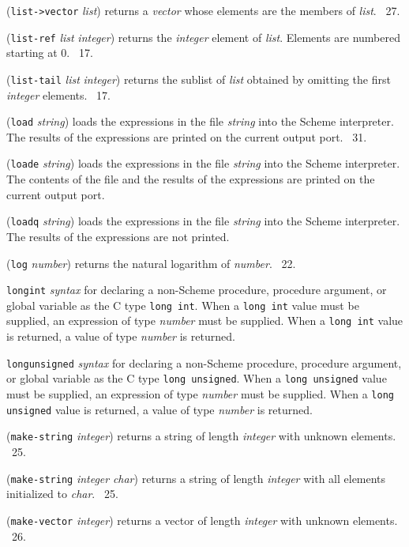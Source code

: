 \documentclass[10pt,twocolumn]{article}
\begin{document}
(\texttt{list->vector} \emph{list}) returns a \emph{vector} whose
elements are the members of \emph{list}.  \RRRRRS~27.

(\texttt{list-ref} \emph{list} \emph{integer}) returns the
\emph{integer} element of \emph{list}.  Elements are numbered starting
at 0.  \RRRRRS~17.

(\texttt{list-tail} \emph{list} \emph{integer}) returns the sublist of
\emph{list} obtained by omitting the first \emph{integer} elements.
\RRRRRS~17.

(\texttt{load} \emph{string}) loads the expressions in the file
\emph{string} into the Scheme interpreter.  The results of the
expressions are printed on the current output port.  \RRRRRS~31.

(\texttt{loade} \emph{string}) loads the expressions in the file
\emph{string} into the Scheme interpreter.  The contents of the file
and the results of the expressions are printed on the current output
port.

(\texttt{loadq} \emph{string}) loads the expressions in the file
\emph{string} into the Scheme interpreter.  The results of the
expressions are not printed.

(\texttt{log} \emph{number}) returns the natural logarithm of
\emph{number}.  \RRRRRS~22.

\texttt{longint} \emph{syntax} for declaring a non-Scheme procedure,
procedure argument, or global variable as the C type \texttt{long
  int}.  When a \texttt{long int} value must be supplied, an
expression of type \emph{number} must be supplied.  When a
\texttt{long int} value is returned, a value of type \emph{number} is
returned.

\texttt{longunsigned} \emph{syntax} for declaring a non-Scheme
procedure, procedure argument, or global variable as the C type
\texttt{long unsigned}. When a \texttt{long unsigned} value must be
supplied, an expression of type \emph{number} must be supplied.  When
a \texttt{long unsigned} value is returned, a value of type
\emph{number} is returned.

(\texttt{make-string} \emph{integer}) returns a string of length
\emph{integer} with unknown elements.  \RRRRRS~25.

(\texttt{make-string} \emph{integer} \emph{char}) returns a string of
length \emph{integer} with all elements initialized to \emph{char}.
\RRRRRS~25.

(\texttt{make-vector} \emph{integer}) returns a vector of length
\emph{integer} with unknown elements.  \RRRRRS~26.
\end{document}
